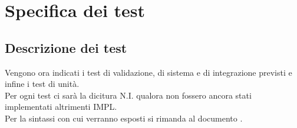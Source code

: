 \section{Specifica dei test}
\label{specificaDeiTest}
	\subsection{Descrizione dei test}
	\label{descrizioneDeiTest}
		Vengono ora indicati i test di validazione, di sistema e di integrazione previsti e infine i test di unità. \\
		Per ogni test ci sarà la dicitura N.I. qualora non fossero ancora stati implementati altrimenti IMPL.\\
		Per la sintassi con cui verranno esposti si rimanda al documento \NPdoc.
